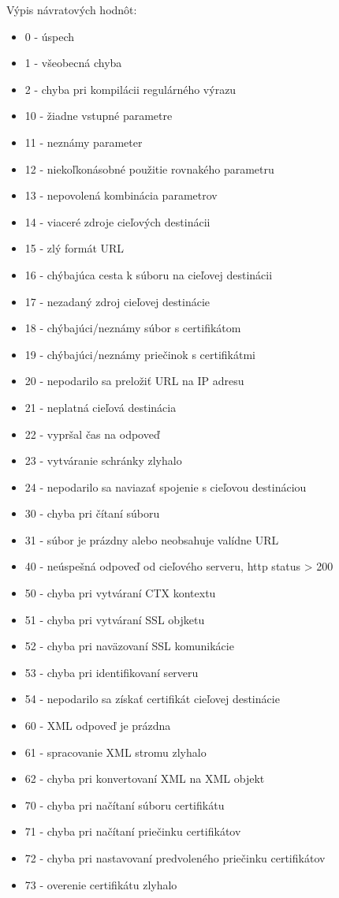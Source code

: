 Výpis návratových hodnôt:
\begin{itemize}
  \item{0 - úspech}
  \item{1 - všeobecná chyba}
  \item{2 - chyba pri kompilácii regulárného výrazu}
  \item{10 - žiadne vstupné parametre}
  \item{11 - neznámy parameter}
  \item{12 - niekoľkonásobné použitie rovnakého parametru}
  \item{13 - nepovolená kombinácia parametrov}
  \item{14 - viaceré zdroje cieľových destinácii}
  \item{15 - zlý formát URL}
  \item{16 - chýbajúca cesta k súboru na cieľovej destinácii}
  \item{17 - nezadaný zdroj cieľovej destinácie}
  \item{18 - chýbajúci/neznámy súbor s certifikátom}
  \item{19 - chýbajúci/neznámy priečinok s certifikátmi}
  \item{20 - nepodarilo sa preložiť URL na IP adresu}
  \item{21 - neplatná cieľová destinácia}
  \item{22 - vypršal čas na odpoveď}
  \item{23 - vytváranie schránky zlyhalo}
  \item{24 - nepodarilo sa naviazať spojenie s cieľovou destináciou}
  \item{30 - chyba pri čítaní súboru}
  \item{31 - súbor je prázdny alebo neobsahuje valídne URL}
  \item{40 - neúspešná odpoveď od cieľového serveru, http status > 200}
  \item{50 - chyba pri vytváraní CTX kontextu}
  \item{51 - chyba pri vytváraní SSL objketu}
  \item{52 - chyba pri naväzovaní SSL komunikácie}
  \item{53 - chyba pri identifikovaní serveru}
  \item{54 - nepodarilo sa získať certifikát cieľovej destinácie}
  \item{60 - XML odpoveď je prázdna}
  \item{61 - spracovanie XML stromu zlyhalo}
  \item{62 - chyba pri konvertovaní XML na XML objekt}
  \item{70 - chyba pri načítaní súboru certifikátu}
  \item{71 - chyba pri načítaní priečinku certifikátov}
  \item{72 - chyba pri nastavovaní predvoleného priečinku certifikátov}
  \item{73 - overenie certifikátu zlyhalo}
\end{itemize}


